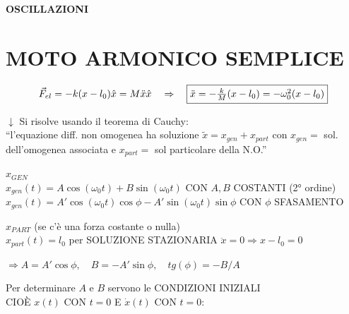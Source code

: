 \documentclass[12pt]{article}
\begin{document}
\begin{center}
\Huge \textbf{OSCILLAZIONI}
\end{center}

\section*{MOTO ARMONICO SEMPLICE}

\begin{minipage}{0.3\textwidth}
\end{minipage}
\begin{minipage}{0.65\textwidth}
$$ \vec{F}_{el} = -k(x-l_0)\hat{x} = M\ddot{x}\hat{x} \quad \Rightarrow \quad \fbox{$\ddot{x} = -\frac{k}{M}(x-l_0) = -\omega_0^2(x-l_0)$} $$
\end{minipage}

\vspace{0.3cm}
$\downarrow$ Si risolve usando il teorema di Cauchy: \\
``l'equazione diff. non omogenea ha soluzione $\tilde{x} = x_{gen} + x_{part}$ con $x_{gen} = $ sol. dell'omogenea associata e $x_{part} = $ sol particolare della N.O.''

\vspace{0.3cm}
\textbf{$x_{GEN}$} \\
$x_{gen}(t) = A\cos(\omega_0 t) + B\sin(\omega_0 t)$ \quad CON $A,B$ COSTANTI (2° ordine) \\
$x_{gen}(t) = A'\cos(\omega_0 t)\cos\phi - A'\sin(\omega_0 t)\sin\phi$ \quad CON $\phi$ SFASAMENTO

\vspace{0.3cm}
\textbf{$x_{PART}$} (se c'è una forza costante o nulla) \\
$x_{part}(t) = l_0$ \quad per SOLUZIONE STAZIONARIA $\ddot{x} = 0 \Rightarrow x - l_0 = 0$

\vspace{0.3cm}
$\Rightarrow A = A'\cos\phi, \quad B = -A'\sin\phi, \quad tg(\phi) = -B/A$

\vspace{0.3cm}
Per determinare $A$ e $B$ servono le CONDIZIONI INIZIALI \\
CIOÈ $x(t)$ CON $t=0$ E $\dot{x}(t)$ CON $t=0$:
\end{document}
